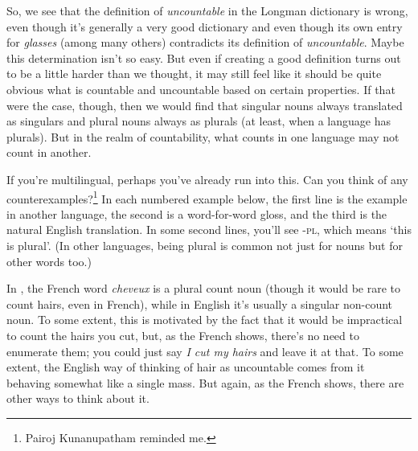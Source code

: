 So, we see that the definition of \textit{uncountable} in the Longman dictionary is wrong, even though it's generally a very good dictionary and even though its own entry for \textit{glasses} (among many others) contradicts its definition of \textit{uncountable}. Maybe this determination isn't so easy. But even if creating a good definition turns out to be a little harder than we thought, it may still feel like it should be quite obvious what is countable and uncountable based on certain properties. If that were the case, though, then we would find that singular nouns always translated as singulars and plural nouns always as plurals (at least, when a language has plurals). But in the realm of countability, what counts in one language may not count in another.

If you're multilingual, perhaps you've already run into this. Can you think of any counterexamples?\footnote{Pairoj Kunanupatham reminded me.}
In each numbered example below, the first line is the example in another language, the second is a word-for-word gloss, and the third is the natural English translation. In some second lines, you'll see -\textsc{pl}, which means `this is plural'. (In other languages, being plural is common not just for nouns but for other words too.)

\ea
{}\label{ex:cheveaux}
\label{ex:Картошка}
\label{ex:khobor}
\label{ex:pease}
\z
\z
{}In , the French word \textit{cheveux} is a plural count noun  (though it would be rare to count hairs, even in French), while in English it's usually a singular non-count noun. To some extent, this is motivated by the fact that it would be impractical to count the hairs you cut, but, as the French shows, there's no need to enumerate them; you could just say \textit{I cut my hairs} and leave it at that. To some extent, the English way of thinking of hair as uncountable comes from it behaving somewhat like a single mass. But again, as the French shows, there are other ways to think about it.

